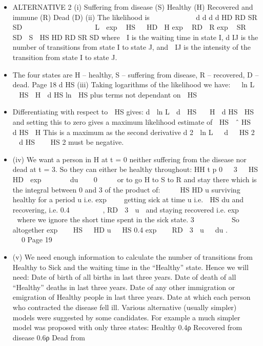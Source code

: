 \documentclass[a4paper,12pt]{article}
\begin{document}
\begin{itemize}
\item ALTERNATIVE 2
(i)
Suffering
from
disease
(S)
Healthy
(H)
Recovered and
immune
(R)
Dead
(D)
(ii)
The likelihood is
 
       
d
d
d
d
HD
RD
SR
SD




       
   
L  exp  HS   HD  H exp  RD  R exp  SR   SD  S  HS
HD
RD
SR
SD
where
 I is the waiting time in state I,
d IJ is the number of transitions from state I to state J,
and  IJ is the intensity of the transition from state I to state J.
\item The four states are H – healthy, S – suffering from disease,
R – recovered, D – dead.
Page 18
d HS %
(iii)
Taking logarithms of the likelihood we have:
 
ln L   HS  H  d HS ln  HS
plus terms not dependant on  HS
\item Differentiating with respect to  HS gives:
d  ln L 
d  HS
  H 
d HS
 HS
and setting this to zero gives a maximum likelihood estimate of  HS
 ˆ
HS

d HS
 H
This is a maximum as the second derivative
d 2  ln L 
 d  
HS
2

d HS
  
HS
2
must be
negative.
\item (iv)
We want a person in H at t = 0 neither suffering from the
disease nor dead at t = 3.
So they can either be healthy throughout:
HH
t p 0
  3
 
HS
HD
 exp       du 
  0
 


or to go H to S to R and stay there which is the integral between
0 and 3 of the product of:
 
 
HS
HD
u
surviving healthy for a period u i.e. exp   
getting sick at time u i.e.  HS du and recovering, i.e. 0.4
  
    ,
RD
 3  u 
and staying recovered i.e. exp    

where we ignore the short time spent in the sick state.
3
 
 
  

So altogether exp    HS   HD u   HS 0.4 exp    RD  3  u   du .
 
 
 
 

0
Page 19 %
\item (v)
We need enough information to calculate the number of transitions from
Healthy to Sick and the waiting time in the “Healthy” state. Hence we will
need:
Date of birth of all births in last three years.
Date of death of all “Healthy” deaths in last three years.
Date of any other immigration or emigration of Healthy people in last three
years.
Date at which each person who contracted the disease fell ill.
Various alternative (usually simpler) models were suggested by some candidates. For
example a much simpler model was proposed with only three states:
Healthy
0.4ρ
Recovered
from
disease
0.6ρ
Dead
from

\end{itemize}
\end{document}
